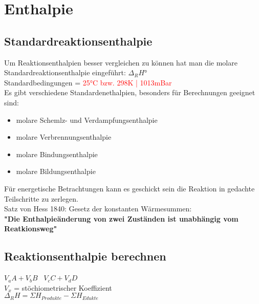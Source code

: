 \section{Enthalpie} \label{sec:enthalpie}

\subsection{Standardreaktionsenthalpie}
Um Reaktionsenthalpien besser vergleichen zu können hat man die molare Standardreaktionsenthalpie eingeführt: $\Delta_RH°$ \\
Standardbedingungen = \textcolor{red}{25°C bzw. 298K | 1013mBar} \\
Es gibt verschiedene Standardenethalpien, besonders für Berechnungen geeignet sind:
\begin{itemize}
    \item molare Schemlz- und Verdampfungsenthalpie
    \item molare Verbrennungsenthalpie
    \item molare Bindungsenthalpie
    \item molare Bildungsenthalpie
\end{itemize}
Für energetische Betrachtungen kann es geschickt sein die Reaktion in gedachte Teilschritte zu zerlegen. \\
Satz von Hess 1840: Gesetz der konstanten Wärmesummen: \\ 
\textbf{"Die Enthalpieänderung von zwei Zuständen ist unabhängig vom Reatkionsweg"}

\subsection{Reaktionsenthalpie berechnen}
$V_aA + V_bB$ \textrightarrow\ $V_cC + V_dD$ \\
$V_x$ = stöchiometrischer Koeffizient \\
$\Delta_RH = \Sigma H_{Produkte} - \Sigma H_{Edukte}$


